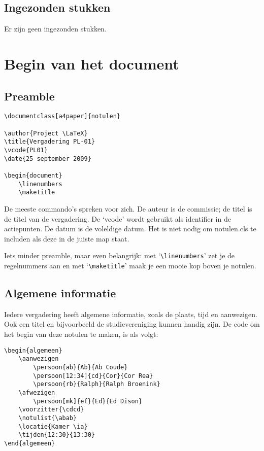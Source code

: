 \documentclass[a4paper]{notulen}
\begin{document}
		\subsection{Ingezonden stukken}
			Er zijn geen ingezonden stukken.

	\section{Begin van het document}
		\subsection{Preamble}
			
			
			\begin{lstlisting}
\documentclass[a4paper]{notulen}

\author{Project \LaTeX}
\title{Vergadering PL-01}
\vcode{PL01}
\date{25 september 2009}

\begin{document}
	\linenumbers
	\maketitle
			\end{lstlisting}
			
			De meeste commando's spreken voor zich. De auteur is de commissie; de titel is de titel van de vergadering. De `vcode' wordt gebruikt
			als identifier in de actiepunten. De datum is de voleldige datum. Het is niet nodig om notulen.cls te includen als deze in de juiste map staat.
			
			Iets minder preamble, maar even belangrijk: met `\lstinline!\linenumbers!' zet je de regelnummers aan en met `\lstinline!\maketitle!' maak
			je een mooie kop boven je notulen.
			
		\subsection{Algemene informatie}
			Iedere vergadering heeft algemene informatie, zoals de plaats, tijd en aanwezigen. Ook een titel en bijvoorbeeld de 
			studievereniging kunnen handig zijn. De code om het begin van deze notulen te maken, is als volgt:
			
			\begin{lstlisting}
\begin{algemeen}
	\aanwezigen
		\persoon{ab}{Ab}{Ab Coude}
		\persoon[12:34]{cd}{Cor}{Cor Rea}
		\persoon{rb}{Ralph}{Ralph Broenink}
	\afwezigen
		\persoon[mk]{ef}{Ed}{Ed Dison}
	\voorzitter{\cdcd}
	\notulist{\abab}
	\locatie{Kamer \ia}
	\tijden{12:30}{13:30}
\end{algemeen}
			\end{lstlisting}
			
\end{document}
